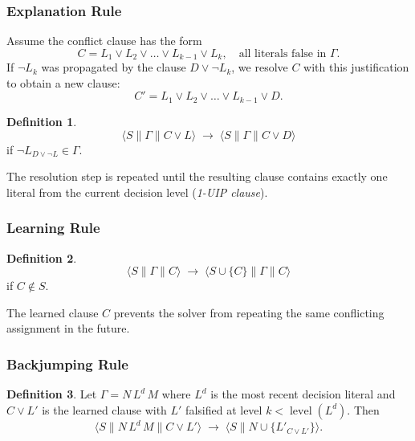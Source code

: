 \documentclass[11pt,a4paper]{article}
\theoremstyle{definition}
\newtheorem{definition}{Definition}[section]
\theoremstyle{plain}
\theoremstyle{remark}
\begin{document}
\subsubsection{Explanation Rule}

Assume the conflict clause has the form
\[
C = L_1 \lor L_2 \lor \dots \lor L_{k-1} \lor L_k, \quad \text{all literals false in } \varGamma.
\]
If $\neg L_k$ was propagated by the clause $D \lor \neg L_k$, we resolve $C$ with this justification to obtain a new clause:
\[
C' = L_1 \lor L_2 \lor \dots \lor L_{k-1} \lor D.
\]

\begin{tcolorbox}[colback=orange!10!white,colframe=orange!75!black,title=\textbf{Explanation Transition}]
\begin{definition}
\[
\langle S \parallel \varGamma \parallel C \lor L \rangle \; \rightarrow \; \langle S \parallel \varGamma \parallel C \lor D \rangle
\]
if $\neg L_{D \lor \neg L} \in \varGamma$.
\end{definition}
\end{tcolorbox}

The resolution step is repeated until the resulting clause contains exactly one literal from the current decision level (\emph{1-UIP clause}).

\subsubsection{Learning Rule}

\begin{tcolorbox}[colback=green!5!white,colframe=green!75!black,title=\textbf{Clause Learning}]
\begin{definition}
\[
\langle S \parallel \varGamma \parallel C \rangle \; \rightarrow \; \langle S \cup \{C\} \parallel \varGamma \parallel C \rangle
\]
if $C \notin S$.
\end{definition}
\end{tcolorbox}

The learned clause $C$ prevents the solver from repeating the same conflicting assignment in the future.

\subsubsection{Backjumping Rule}

\begin{tcolorbox}[colback=purple!5!white,colframe=purple!75!black,title=\textbf{Backjumping}]
\begin{definition}
Let $\varGamma = N\,L^d\,M$ where $L^d$ is the most recent decision literal and $C \lor L'$ is the learned clause with $L'$ falsified at level $k<\operatorname{level}(L^d)$. Then
\[
\langle S \parallel N\,L^d\,M \parallel C \lor L' \rangle \; \rightarrow \; \langle S \parallel N \cup \{L'_{C \lor L'}\} \rangle.
\]
\end{definition}
\end{tcolorbox}
\end{document}
